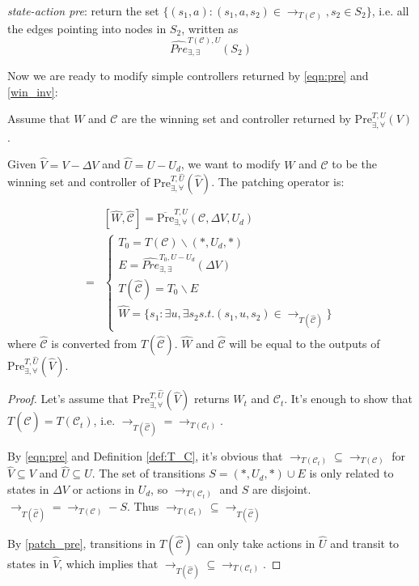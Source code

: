 \emph{state-action pre}: return the set $ \{(s_1,a): (s_1,a,s_2)\in \rightarrow_{T(\mathcal{C})}, s_2\in S_2\} $, i.e. all the edges pointing into nodes in $ S_2 $, written as
\begin{displaymath}
\widehat{Pre}^{T(\mathcal{C}),U}_{\exists,\exists}(S_2)
\end{displaymath}

Now we are ready to modify simple controllers returned by \eqref{eqn:pre} and \eqref{win_inv}:

Assume that  $ W $ and $ \mathcal{C} $ are the winning set and controller returned by $ \text{Pre}_{\exists,\forall}^{T, U}(V) $. 

Given $ \widehat{V}= V-\Delta V $ and $ \widehat{U} = U-U_d $, we want to modify $ W $ and $ \mathcal{C} $ to be the winning set and controller of $ \text{Pre}_{\exists,\forall}^{T,\widehat{U}}(\widehat{V}) $. The patching operator is:

\begin{align}
&[\widehat{W},\widehat{\mathcal{C}}]=\overline{\text{Pre}}_{\exists,\forall}^{T, U}(\mathcal{C},\Delta V,U_d)\\
=&\begin{cases} 
T_{0} = T(\mathcal{C})\backslash (*,U_d,*)\\
E =  \widehat{Pre}^{T_0,U-U_d}_{\exists,\exists}(\Delta V)\\
T(\widehat{\mathcal{C}}) = T_{0}\backslash E\\
\widehat{W} = \{s_1: \exists u, \exists s_2 s.t. (s_1,u, s_2)\in \rightarrow_{T(\widehat{\mathcal{C}})} \}
\end{cases}\label{patch_pre}
\end{align}
where $ \widehat{\mathcal{C}} $ is converted from $ T(\widehat{\mathcal{C}}) $. $ \widehat{W} $ and $ \widehat{\mathcal{C}} $ will be equal to the outputs of $ \text{Pre}_{\exists,\forall}^{T,\widehat{U}}(\widehat{V}) $.

\begin{proof}
	Let's assume that $ \text{Pre}_{\exists,\forall}^{T,\widehat{U}}(\widehat{V}) $ returns $ W_t $ and $ \mathcal{C}_t $. It's enough to show that $ T(\widehat{\mathcal{C}})= T(\mathcal{C}_t)$, i.e. $ \rightarrow_{T(\widehat{\mathcal{C}})} = \rightarrow_{T(\mathcal{C}_t)} $. 
	
	By \eqref{eqn:pre} and Definition \ref{def:T_C}, it's obvious that $ \rightarrow_{T(\mathcal{C}_t)} \subseteq \rightarrow_{T(\mathcal{C})}$ for $ \widehat{V}\subseteq V $ and $ \widehat{U}\subseteq U $. The set of transitions $ S = (*,U_d,*)\cup E $ is only related to states in $ \Delta V $ or actions in $ U_d $, so $\rightarrow_{T(\mathcal{C}_t)}$ and $ S $ are disjoint. $ \rightarrow_{T(\widehat{\mathcal{C}})}= \rightarrow_{T(\mathcal{C})}-S$. Thus $ \rightarrow_{T(\mathcal{C}_t)}\subseteq \rightarrow_{T(\widehat{\mathcal{C}})}$ 
	
	By \eqref{patch_pre}, transitions in $ T(\widehat{\mathcal{C}}) $ can only take actions in $ \widehat{U} $ and transit to states in $ \widehat{V} $, which implies that $ \rightarrow_{T(\widehat{\mathcal{C}})}\subseteq \rightarrow_{T(\mathcal{C}_t)} $.  
\end{proof}

